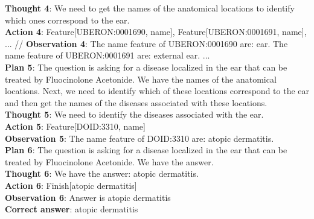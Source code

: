 \documentclass[11pt]{article}
\begin{document}
\begin{tcolorbox}[colback=white!10!white, colframe=blue!30!black, title=True Case (Biomedical), boxrule=1pt, fontupper={\fontsize{8pt}{10pt}\selectfont}]
\textbf{Thought 4}: We need to get the names of the anatomical locations to identify which ones correspond to the ear.\\
\textbf{Action 4}: Feature[UBERON:0001690, name], Feature[UBERON:0001691, name], ... //
\textbf{Observation 4}: The name feature of UBERON:0001690 are: ear. The name feature of UBERON:0001691 are: external ear. ... \\
\textbf{Plan 5}: The question is asking for a disease localized in the ear that can be treated by Fluocinolone Acetonide. We have the names of the anatomical locations. Next, we need to identify which of these locations correspond to the ear and then get the names of the diseases associated with these locations.\\
\textbf{Thought 5}: We need to identify the diseases associated with the ear.\\
\textbf{Action 5}: Feature[DOID:3310, name]\\
\textbf{Observation 5}: The name feature of DOID:3310 are: atopic dermatitis. \\
\textbf{Plan 6}: The question is asking for a disease localized in the ear that can be treated by Fluocinolone Acetonide. We have the answer.\\
\textbf{Thought 6}: We have the answer: atopic dermatitis.\\
\textbf{Action 6}: Finish[atopic dermatitis]\\
\textbf{Observation 6}: Answer is atopic dermatitis\\
\textbf{Correct answer}: atopic dermatitis
\end{tcolorbox}
\end{document}
